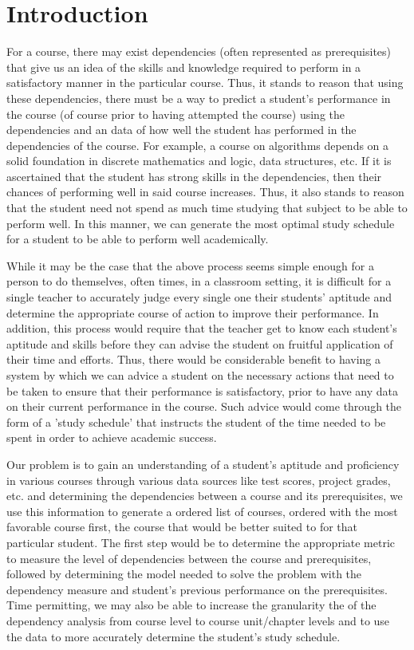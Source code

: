 \documentclass[conference]{IEEEtran}
\begin{document}
	\section{Introduction}
For a course, there may exist dependencies (often represented as prerequisites) that give us an idea of the skills and knowledge required to perform in a satisfactory manner in the particular course. Thus, it stands to reason that using these dependencies, there must be a way to predict a student's performance in the course (of course prior to having attempted the course) using the dependencies and an data of how well the student has performed in the dependencies of the course. For example, a course on algorithms depends on a solid foundation in discrete mathematics and logic, data structures, etc. If it is ascertained that the student has strong skills in the dependencies, then their chances of performing well in said course increases. Thus, it also stands to reason that the student need not spend as much time studying that subject to be able to perform well. In this manner, we can generate the most optimal study schedule for a student to be able to perform well academically.

While it may be the case that the above process seems simple enough for a person to do themselves, often times, in a classroom setting, it is difficult for a single teacher to accurately judge every single one their students' aptitude and determine the appropriate course of action to improve their performance. In addition, this process would require that the teacher get to know each student's aptitude and skills before they can advise the student on fruitful application of their time and efforts. Thus, there would be considerable benefit to having a system by which we can advice a student on the necessary actions that need to be taken to ensure that their performance is satisfactory, prior to have any data on their current performance in the course. Such advice would come through the form of a 'study schedule' that instructs the student of the time needed to be spent in order to achieve academic success.

Our problem is to gain an understanding of a student's aptitude and proficiency in various courses through various data sources like test scores, project grades, etc. and determining the dependencies between a course and its prerequisites, we use this information to generate a ordered list of courses, ordered with the most favorable course first, the course that would be better suited to for that particular student. The first step would be to determine the appropriate metric to measure the level of dependencies between the course and prerequisites, followed by determining the model needed to solve the problem with the dependency measure and student's previous performance on the prerequisites. Time permitting, we may also be able to increase the granularity the of the dependency analysis from course level to course unit/chapter levels and to use the data to more accurately determine the student's study schedule.
\end{document}
